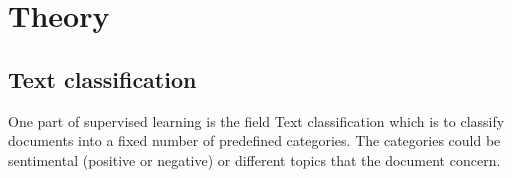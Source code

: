 

\section{Theory}

\subsection{Text classification}
One part of supervised learning is the field Text classification which is to classify documents into a fixed number of predefined categories. The categories could be sentimental (positive or negative) or different topics that the document concern.

